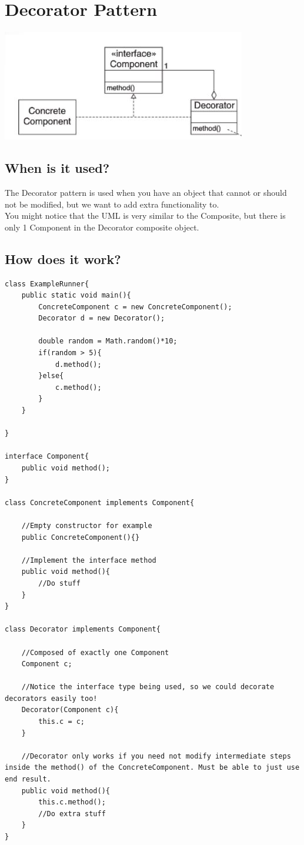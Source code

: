 \documentclass[12pt]{article}
\theoremstyle{definition}
\begin{document}
\section{Decorator Pattern}
\includegraphics{decorator}\\
\subsection{When is it used?}
The Decorator pattern is used when you have an object that cannot or should not be modified, but we want to add extra functionality to. 
\\ \linebreak
You might notice that the UML is very similar to the Composite, but there is only 1 Component in the Decorator composite object. 
\\ \linebreak

\subsection{How does it work?}
\begin{lstlisting}
class ExampleRunner{
	public static void main(){
		ConcreteComponent c = new ConcreteComponent();
		Decorator d = new Decorator();
		
		double random = Math.random()*10;
		if(random > 5){
			d.method();
		}else{
			c.method();
		}
	}

}

interface Component{
	public void method();
}

class ConcreteComponent implements Component{

	//Empty constructor for example
	public ConcreteComponent(){}
	
	//Implement the interface method
	public void method(){
		//Do stuff
	}
}

class Decorator implements Component{

	//Composed of exactly one Component
	Component c;
	
	//Notice the interface type being used, so we could decorate decorators easily too!
	Decorator(Component c){
		this.c = c;
	}
	
	//Decorator only works if you need not modify intermediate steps inside the method() of the ConcreteComponent. Must be able to just use end result.
	public void method(){
		this.c.method();
		//Do extra stuff 
	}
}
\end{lstlisting}
\end{document}
